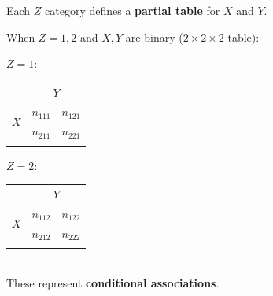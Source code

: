\documentclass[11pt]{elegantbook}
\begin{document}
\begin{definition}
    \normalfont
    Each $Z$ category defines a \textbf{partial table} for $X$ and $Y$.
\end{definition}
\begin{example}
    When $Z = 1, 2$ and $X , Y$ are binary ($2\times 2 \times 2$ table):
    \begin{table}[htbp]
        \centering
        $Z=1:$
        \begin{tabular}{rllll}
            \multicolumn{1}{c}{}                    & \multicolumn{4}{c}{$Y$}                                 \\ \cline{2-5} 
            \multicolumn{1}{r|}{\multirow{2}{*}{$X$}} & \multicolumn{2}{l|}{$n_{111}$} & \multicolumn{2}{l|}{$n_{121}$} \\ \cline{2-5} 
            \multicolumn{1}{r|}{}                   & \multicolumn{2}{l|}{$n_{211}$} & \multicolumn{2}{l|}{$n_{221}$} \\ \cline{2-5}
            \multicolumn{1}{l}{}                    &             &             &             &
        \end{tabular}\quad\quad
        $Z=2:$
        \begin{tabular}{rllll}
            \multicolumn{1}{c}{}                    & \multicolumn{4}{c}{$Y$}                                 \\ \cline{2-5} 
            \multicolumn{1}{r|}{\multirow{2}{*}{$X$}} & \multicolumn{2}{l|}{$n_{112}$} & \multicolumn{2}{l|}{$n_{122}$} \\ \cline{2-5} 
            \multicolumn{1}{r|}{}                   & \multicolumn{2}{l|}{$n_{212}$} & \multicolumn{2}{l|}{$n_{222}$} \\ \cline{2-5}
            \multicolumn{1}{l}{}                    &             &             &             &
        \end{tabular}\\
        These represent \textbf{conditional associations}.
    \end{table}\\
\end{example}
\end{document}
